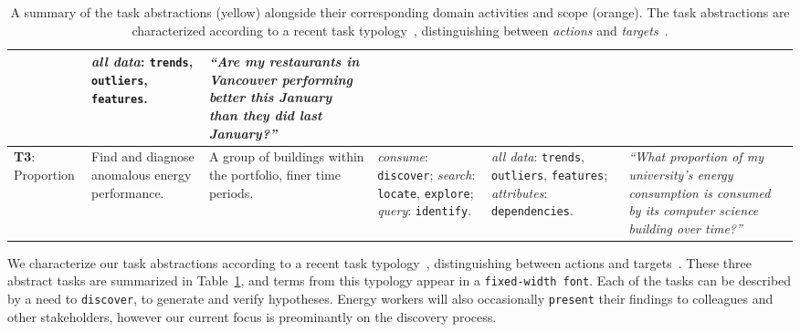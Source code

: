 \documentclass[journal]{vgtc}                %
\begin{document}
\begin{table}[ht]
\begin{center}
\begin{tabular}{p{}|>{\RaggedRight}p{}|>{\RaggedRight}p{}|>{\RaggedRight}p{}|>{\RaggedRight}p{}|>{\RaggedRight}p{}}
        & {\it all data}: {\tt trends}, {\tt outliers}, {\tt features}.
        
        & {\it ``Are my restaurants in Vancouver performing better this January than they did last January?''} \\ \hline
        \cellcolor{nmYellow} {\bf T3}: Proportion 
        
        & \cellcolor{nmOrange} Find and diagnose anomalous energy performance. 
        
        & \cellcolor{nmOrange} A group of buildings within the portfolio, finer time periods. 
        
        & {\it consume}: {\tt discover}; {\it search}: {\tt locate}, {\tt explore}; {\it query}: {\tt identify}. 
        
        & {\it all data}: {\tt trends}, {\tt outliers}, {\tt features}; {\it attributes}: {\tt dependencies}. 
        
        & {\it ``What proportion of my university's energy consumption is consumed by its computer science building over time?''} \\ \hline  
        
    \end{tabular}
    \vspace{-0.3cm}
    \caption{A summary of the task abstractions (yellow) alongside their corresponding domain activities and scope (orange). The task abstractions are characterized according to a recent task typology~\cite{Brehmer2013}, distinguishing between \textsl{actions} and \textsl{targets}~\cite{Munzner2014}.}
    \label{tab:task-abstractions}
    \end{center}
    \vspace{-0.9cm}
\end{table}

We characterize our task abstractions according to a recent task typology~\cite{Brehmer2013}, distinguishing between actions and targets~\cite{Munzner2014}. 
These three abstract tasks are summarized in Table~\ref{tab:task-abstractions}, and terms from this typology appear in a {\tt fixed-width font}.
Each of the tasks can be described by a need to {\tt discover}, to generate and verify hypotheses.
Energy workers will also occasionally {\tt present} their findings to colleagues and other stakeholders, however our current focus is preominantly on the discovery process. 
\end{document}

